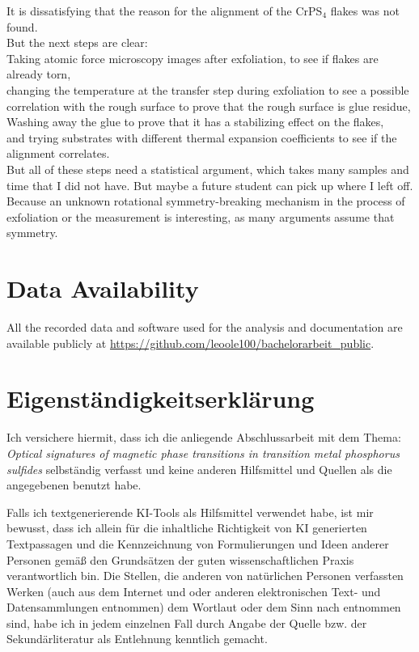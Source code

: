 \documentclass[
	oneside,
	parskip=half,
	a4paper,
]{scrbook}
\begin{document}
It is dissatisfying that the reason for the alignment of the CrPS$_4$ flakes was not found.\\
But the next steps are clear:\\
Taking atomic force microscopy images after exfoliation, to see if flakes are already torn,\\
changing the temperature at the transfer step during exfoliation to see a possible correlation with the rough surface to prove that the rough surface is glue residue,\\
Washing away the glue to prove that it has a stabilizing effect on the flakes,\\
and trying substrates with different thermal expansion coefficients to see if the alignment correlates. \\
But all of these steps need a statistical argument, which takes many samples and time that I did not have.
But maybe a future student can pick up where I left off.
Because an unknown rotational symmetry-breaking mechanism in the process of exfoliation or the measurement is interesting, as many arguments assume that symmetry.



\backmatter
\nocite{*}
\printbibliography

\section*{Data Availability}
All the recorded data and software used for the analysis and documentation are available publicly at \url{https://github.com/leoole100/bachelorarbeit_public}.


\clearpage
\section*{Eigenständigkeitserklärung}

Ich versichere hiermit, dass ich die anliegende Abschlussarbeit mit dem Thema:
\textit{Optical signatures of magnetic phase transitions in transition metal phosphorus sulfides}
selbständig verfasst und keine anderen Hilfsmittel und Quellen als die angegebenen benutzt habe.

Falls ich textgenerierende KI-Tools als Hilfsmittel verwendet habe, ist mir bewusst, dass ich allein für
die inhaltliche Richtigkeit von KI generierten Textpassagen und die Kennzeichnung von
Formulierungen und Ideen anderer Personen gemäß den Grundsätzen der guten wissenschaftlichen
Praxis verantwortlich bin. Die Stellen, die anderen von natürlichen Personen verfassten Werken (auch
aus dem Internet und oder anderen elektronischen Text- und Datensammlungen entnommen) dem
Wortlaut oder dem Sinn nach entnommen sind, habe ich in jedem einzelnen Fall durch Angabe der
Quelle bzw. der Sekundärliteratur als Entlehnung kenntlich gemacht.
\end{document}
